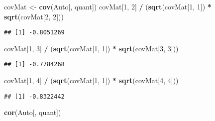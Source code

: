 \documentclass[
]{article}
\newenvironment{Shaded}{\begin{snugshade}}{\end{snugshade}}
\newcommand{\DecValTok}[1]{\textcolor[rgb]{0.00,0.00,0.81}{#1}}
\newcommand{\FunctionTok}[1]{\textcolor[rgb]{0.13,0.29,0.53}{\textbf{#1}}}
\newcommand{\NormalTok}[1]{#1}
\newcommand{\OtherTok}[1]{\textcolor[rgb]{0.56,0.35,0.01}{#1}}
\newcommand{\SpecialCharTok}[1]{\textcolor[rgb]{0.81,0.36,0.00}{\textbf{#1}}}
\begin{document}
\begin{Shaded}
\begin{Highlighting}[]
\NormalTok{covMat }\OtherTok{\textless{}{-}} \FunctionTok{cov}\NormalTok{(Auto[, quant])}
\NormalTok{covMat[}\DecValTok{1}\NormalTok{, }\DecValTok{2}\NormalTok{] }\SpecialCharTok{/}\NormalTok{ (}\FunctionTok{sqrt}\NormalTok{(covMat[}\DecValTok{1}\NormalTok{, }\DecValTok{1}\NormalTok{]) }\SpecialCharTok{*} \FunctionTok{sqrt}\NormalTok{(covMat[}\DecValTok{2}\NormalTok{, }\DecValTok{2}\NormalTok{]))}
\end{Highlighting}
\end{Shaded}

\begin{verbatim}
## [1] -0.8051269
\end{verbatim}

\begin{Shaded}
\begin{Highlighting}[]
\NormalTok{covMat[}\DecValTok{1}\NormalTok{, }\DecValTok{3}\NormalTok{] }\SpecialCharTok{/}\NormalTok{ (}\FunctionTok{sqrt}\NormalTok{(covMat[}\DecValTok{1}\NormalTok{, }\DecValTok{1}\NormalTok{]) }\SpecialCharTok{*} \FunctionTok{sqrt}\NormalTok{(covMat[}\DecValTok{3}\NormalTok{, }\DecValTok{3}\NormalTok{]))}
\end{Highlighting}
\end{Shaded}

\begin{verbatim}
## [1] -0.7784268
\end{verbatim}

\begin{Shaded}
\begin{Highlighting}[]
\NormalTok{covMat[}\DecValTok{1}\NormalTok{, }\DecValTok{4}\NormalTok{] }\SpecialCharTok{/}\NormalTok{ (}\FunctionTok{sqrt}\NormalTok{(covMat[}\DecValTok{1}\NormalTok{, }\DecValTok{1}\NormalTok{]) }\SpecialCharTok{*} \FunctionTok{sqrt}\NormalTok{(covMat[}\DecValTok{4}\NormalTok{, }\DecValTok{4}\NormalTok{]))}
\end{Highlighting}
\end{Shaded}

\begin{verbatim}
## [1] -0.8322442
\end{verbatim}

\begin{Shaded}
\begin{Highlighting}[]
\FunctionTok{cor}\NormalTok{(Auto[, quant])}
\end{Highlighting}
\end{Shaded}
\end{document}

